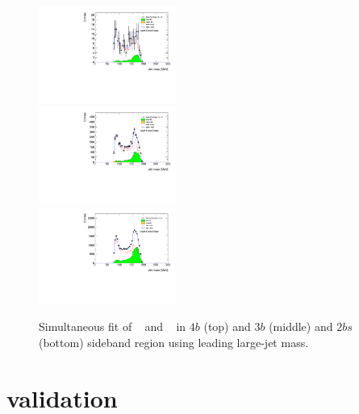 \begin{figure}[htbp!]
\begin{center}
 \includegraphics[width=0.4\textwidth,angle=-90]{figures/boosted/Fit/fitNorm_i4.pdf}\\
 \includegraphics[width=0.4\textwidth,angle=-90]{figures/boosted/Fit/fitNorm_i3.pdf}\\
 \includegraphics[width=0.4\textwidth,angle=-90]{figures/boosted/Fit/fitNorm_i2s.pdf}\\
\caption{Simultaneous fit of \muqcd~ and \alphatt~ in $4b$ (top) and $3b$ (middle) and $2bs$ (bottom) sideband region using leading large-\R jet mass.}
\label{fig:ttbar-fit}
\end{center}
\end{figure}



\section{\muqcd validation}
